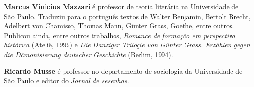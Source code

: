 \textbf{Marcus Vinicius Mazzari} é professor de teoria literária na Universidade
de São Paulo. Traduziu para o português textos de Walter Benjamin, Bertolt
Brecht, Adelbert von Chamisso, Thomas Mann, Günter Grass, Goethe, entre outros.
Publicou ainda, entre outros trabalhos, \textit{Romance de formação em perspectiva histórica}
(Ateliê, 1999) e \textit{Die Danziger Trilogie von Günter Grass. Erzählen gegen
die Dämonisierung deutscher Geschichte} (Berlim, 1994).

\textbf{Ricardo Musse} é professor no departamento de sociologia da Universidade
de São Paulo e editor do \textit{Jornal de sesenhas}.\par




